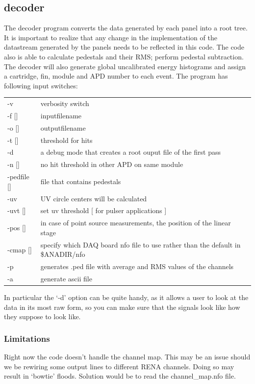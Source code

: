 \documentclass[12pt]{article}
\begin{document}
\subsection{decoder}
The decoder program converts the data generated by each panel into a root tree. It is important to realize that any change in the implementation of the datastream generated by the panels needs to be reflected in this code. The code also is able to calculate pedestals and their RMS; perform pedestal subtraction. The decoder will also generate global uncalibrated energy histograms and assign a cartridge, fin, module and APD number to each event. The program has following input switches:\\
\begin{tabular}{ll}
   -v  &  verbosity switch \\
   -f [] & inputfilename \\
   -o [] & outputfilename \\
   -t [] & threshold for hits \\
   -d  & a debug mode that creates a root ouput file of the first pass \\
   -n  []& no hit threshold in other APD on same module \\
   -pedfile [] & file that contains pedestals\\
   -uv & UV circle centers will be calculated\\
   -uvt []& set uv threshold [ for pulser applications ]\\
   -pos []& in case of point source measurements, the position of the linear stage\\
   -cmap [] & specify which DAQ board nfo file to use rather than the default in \$ANADIR/nfo\\
   -p  & generates .ped file with average and RMS values of the channels \\
   -a  & generate ascii file \\
\end{tabular}
In particular the `-d' option can be quite handy, as it allows a user to look at the data in its most raw form, so you can make sure that the signals look like how they suppose to look like. 

\subsubsection{Limitations} 
Right now the code doesn't handle the channel map. This may be an issue should we be rewiring some output lines to different RENA channels. Doing so may result in `bowtie' floods. Solution would be to read the channel\_map.nfo file. 
\end{document}
